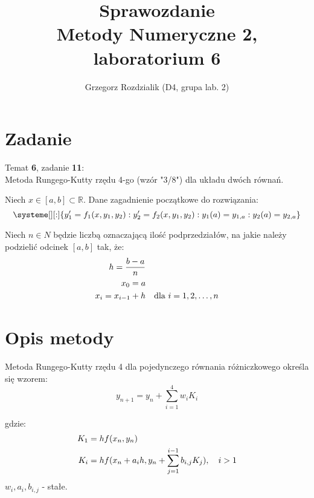 \documentclass[12pt]{article}
\begin{document}
	\title{Sprawozdanie\\Metody Numeryczne 2, laboratorium 6}
	\author{Grzegorz Rozdzialik (D4, grupa lab. 2)}
	\maketitle	
	
	\section{Zadanie}
	{\Large Temat \textbf{6}, zadanie \textbf{11}:}\\
	Metoda Rungego-Kutty rzędu 4-go (wzór "3/8") dla układu dwóch równań.
	
	Niech $x \in [a, b] \subset \mathbb{R}$. Dane zagadnienie początkowe do rozwiązania:
	\begin{equation}
	\systeme[][:]{
		y_1' = f_1(x, y_1, y_2) :
		y_2' = f_2(x, y_1, y_2) :
		y_1(a) = y_{1, a} :
		y_2(a) = y_{2, a}
	}
	\end{equation}
	
	Niech $n \in N$ będzie liczbą oznaczającą ilość podprzedziałów, na jakie należy podzielić odcinek $[a, b]$ tak, że:
	\begin{align*}
		h = \frac{b - a}{n} & \\
		x_0 = a & \\
		x_i = x_{i - 1} + h & \hspace{10px} \mbox{dla } i = 1, 2, \dots, n
	\end{align*}
	
	
	
	
	\section{Opis metody}
	Metoda Rungego-Kutty rzędu 4 dla pojedynczego równania różniczkowego określa się wzorem:
	\begin{equation}
		\label{eq:RK4}
		y_{n+1} = y_n + \sum_{i = 1}^{4} w_i K_i
	\end{equation}
	
	gdzie:
	\begin{align*}
		K_1 &= hf(x_n, y_n) \\
		K_i &= hf(x_n + a_i h, y_n + \sum_{j = 1}^{i - 1} b_{i, j} K_j), \hspace{10px} i > 1
	\end{align*}
	$w_i, a_i, b_{i, j}$ - stałe.
	
\end{document}
